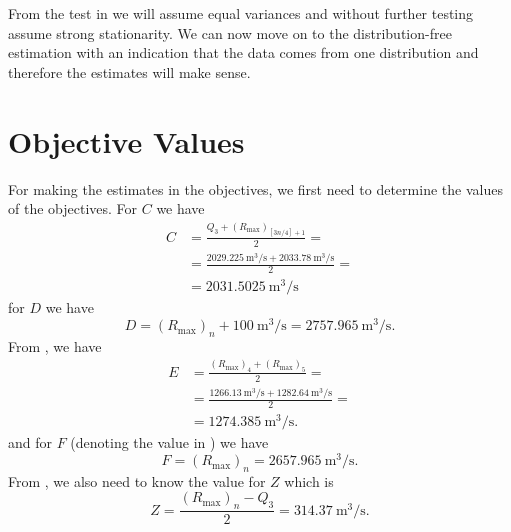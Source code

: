 \begin{table}[H]
  
  \caption{Levene's test of equality of variances centred by the sample means and applied to even and odd samples of the
  time-series.}
  \label{tab:var_test}
\end{table}

From the test in  we will assume equal variances and without further testing assume strong
stationarity. We can now move on to the distribution-free estimation with an indication that the data comes from one
distribution and therefore the estimates will make sense.

\section{Objective Values}%
\label{sec:objective_values}

For making the estimates in the objectives, we first need to determine the values of the objectives.
For \(C\) we have
\[
    \begin{split}
        C &= \frac{Q_3 +  (R_{\max})_{[3n/4] + 1}}{2} = \\
          &= \frac{\qty{2029.225}{\metre\cubed\per\second} + \qty{2033.78}{\metre\cubed\per\second}}{2} = \\
          &= \qty{2031.5025}{\metre\cubed\per\second}
    \end{split}
\]
for \(D\) we have
\[
    D = (R_{\max})_n + \qty{100}{\metre\cubed\per\second} = \qty{2757.965}{\metre\cubed\per\second}.
\]
From , we have \[
    \begin{split}
        E &= \frac{(R_{\max})_{4} +  (R_{\max})_{5}}{2} = \\
          &= \frac{\qty{1266.13}{\metre\cubed\per\second} + \qty{1282.64}{\metre\cubed\per\second}}{2} = \\
          &= \qty{1274.385}{\metre\cubed\per\second}.
    \end{split}
\] 
and for \(F\) (denoting the value in ) we have
\[
    F = (R_{\max})_n = \qty{2657.965}{\metre\cubed\per\second}.
\] 
From , we also need to know the value for \(Z\) which is \[
    Z = \frac{(R_{\max})_n - Q_3}{2} = \qty{314.37}{\metre\cubed\per\second}.
\] 

\begin{table}[h!]
    \centering
    
    \caption{Values that occur in the objectives}
\end{table}


